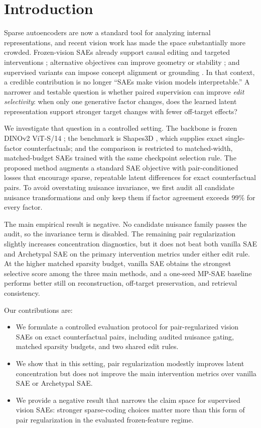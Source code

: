 \section{Introduction}

Sparse autoencoders are now a standard tool for analyzing internal representations, and recent vision work has made the space substantially more crowded. Frozen-vision SAEs already support causal editing and targeted interventions \citep{Stevens2025Interpretable,Han2025Causal}; alternative objectives can improve geometry or stability \citep{Fel2025Archetypal,Hindupur2025Projecting}; and supervised variants can impose concept alignment or grounding \citep{Ding2025ConceptSAE,NasiriSarvi2025SPARC}. In that context, a credible contribution is no longer ``SAEs make vision models interpretable.'' A narrower and testable question is whether paired supervision can improve \emph{edit selectivity}: when only one generative factor changes, does the learned latent representation support stronger target changes with fewer off-target effects?

We investigate that question in a controlled setting. The backbone is frozen DINOv2 ViT-S/14 \citep{Oquab2024DINOv2}; the benchmark is Shapes3D \citep{3dshapes18}, which supplies exact single-factor counterfactuals; and the comparison is restricted to matched-width, matched-budget SAEs trained with the same checkpoint selection rule. The proposed method augments a standard SAE objective with pair-conditioned losses that encourage sparse, repeatable latent differences for exact counterfactual pairs. To avoid overstating nuisance invariance, we first audit all candidate nuisance transformations and only keep them if factor agreement exceeds 99\% for every factor.

The main empirical result is negative. No candidate nuisance family passes the audit, so the invariance term is disabled. The remaining pair regularization slightly increases concentration diagnostics, but it does not beat both vanilla SAE and Archetypal SAE on the primary intervention metrics under either edit rule. At the higher matched sparsity budget, vanilla SAE obtains the strongest selective score among the three main methods, and a one-seed MP-SAE baseline performs better still on reconstruction, off-target preservation, and retrieval consistency.

Our contributions are:
\begin{itemize}
  \item We formulate a controlled evaluation protocol for pair-regularized vision SAEs on exact counterfactual pairs, including audited nuisance gating, matched sparsity budgets, and two shared edit rules.
  \item We show that in this setting, pair regularization modestly improves latent concentration but does not improve the main intervention metrics over vanilla SAE or Archetypal SAE.
  \item We provide a negative result that narrows the claim space for supervised vision SAEs: stronger sparse-coding choices matter more than this form of pair regularization in the evaluated frozen-feature regime.
\end{itemize}

